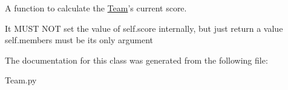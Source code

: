 \-A function to calculate the \hyperlink{classTeam_1_1Team}{\-Team}'s current score. 

\-It \-M\-U\-S\-T \-N\-O\-T set the value of self.\-score internally, but just return a value self.\-members must be its only argument 

\-The documentation for this class was generated from the following file\-:\begin{DoxyCompactItemize}
\item 
\-Team.\-py\end{DoxyCompactItemize}
